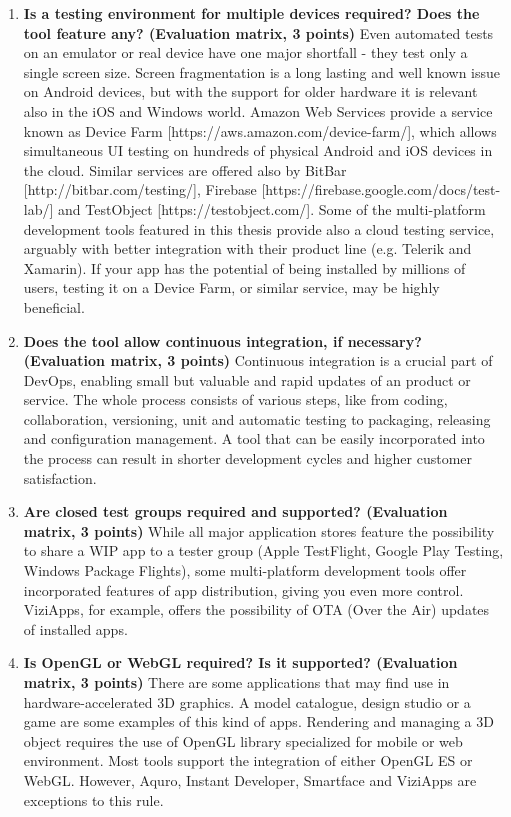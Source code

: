 \documentclass[english,master,public,dept460,male,cpdeclaration,oneside]{diploma}
\begin{document}
\begin{enumerate}
	\item \textbf{Is a testing environment for multiple devices required? Does the tool feature any? (Evaluation matrix, 3 points) }
	Even automated tests on an emulator or real device have one major shortfall - they test only a single screen size. Screen fragmentation is a long lasting and well known issue on Android devices, but with the support for older hardware it is relevant also in the iOS and Windows world. Amazon Web Services provide a service known as Device Farm [https://aws.amazon.com/device-farm/], which allows simultaneous UI testing on hundreds of physical Android and iOS devices in the cloud. Similar services are offered also by BitBar [http://bitbar.com/testing/], Firebase [https://firebase.google.com/docs/test-lab/] and TestObject [https://testobject.com/]. Some of the multi-platform development tools featured in this thesis provide also a cloud testing service, arguably with better integration with their product line (e.g. Telerik and Xamarin). If your app has the potential of being installed by millions of users, testing it on a Device Farm, or similar service, may be highly beneficial.
	
	\item \textbf{Does the tool allow continuous integration, if necessary? (Evaluation matrix, 3 points) }
	Continuous integration is a crucial part of DevOps, enabling small but valuable and rapid updates of an product or service. The whole process consists of various steps, like from coding, collaboration, versioning, unit and automatic testing to packaging, releasing and configuration management. A tool that can be easily incorporated into the process can result in shorter development cycles and higher customer satisfaction.
	
	\item \textbf{Are closed test groups required and supported? (Evaluation matrix, 3 points) }
	While all major application stores feature the possibility to share a WIP app to a tester group (Apple TestFlight, Google Play Testing, Windows Package Flights), some multi-platform development tools offer incorporated features of app distribution, giving you even more control. ViziApps, for example, offers the possibility of OTA (Over the Air) updates of installed apps.
	
	\item \textbf{Is OpenGL or WebGL required? Is it supported? (Evaluation matrix, 3 points) }
	There are some applications that may find use in hardware-accelerated 3D graphics. A model catalogue, design studio or a game are some examples of this kind of apps. Rendering and managing a 3D object requires the use of OpenGL library specialized for mobile or web environment. Most tools support the integration of either OpenGL ES or WebGL. However, Aquro, Instant Developer, Smartface and ViziApps are exceptions to this rule.
	

\end{enumerate}
\end{document}
